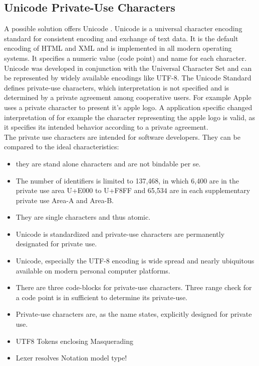 \subsection{Unicode Private-Use Characters}
A possible solution offers Unicode \cite{Unicode}. Unicode is a universal character encoding standard for consistent encoding and exchange of text data. It is the default encoding of HTML and XML and is implemented in all modern operating systems. It specifies a numeric value (code point) and name for each character. Unicode was developed in conjunction with the Universal Character Set and can be represented by widely available encodings like UTF-8. The Unicode Standard defines private-use characters, which interpretation is not specified and is determined by a private agreement among cooperative users. For example Apple uses a private character to present it's apple logo. A application specific changed interpretation of for example the character representing the apple logo is valid, as it specifies its intended behavior according to a private agreement.\\
The private use characters are intended for software developers. They can be compared to the ideal characteristics:
\begin{itemize}
	\item they are stand alone characters and are not bindable per se.
	\item The number of identifiers is limited to 137,468, in which 6,400 are in the private use area U+E000 to U+F8FF and 65,534 are in each supplementary private use Area-A and Area-B. 
	\item They are single characters and thus atomic. 
	\item Unicode is standardized and private-use characters are permanently designated for private use.
	\item Unicode, especially the UTF-8 encoding is wide spread and nearly ubiquitous available on modern personal computer platforms.
	\item There are three code-blocks for private-use characters. Three range check for a code point is in sufficient to determine its private-use.
	\item Private-use characters are, as the name states, explicitly designed for private use.
\end{itemize}

\begin{itemize}
	\item UTF8 Tokens enclosing Masquerading
	\item Lexer resolves Notation model type!
\end{itemize}
	


